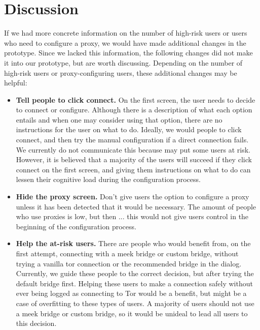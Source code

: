 \documentclass{template}
\begin{document}
\section{Discussion} 

If we had more concrete information on the number of high-risk users or users who need to configure a proxy, we would have made additional changes in the prototype. Since we lacked this information, the following changes did not make it into our prototype, but are worth discussing. Depending on the number of high-risk users or proxy-configuring users, these additional changes may be helpful: 
\begin{itemize} \itemsep1pt \parskip0pt  
\item {\bfseries Tell people to click connect.} On the first screen, the user needs to decide to connect or configure. Although there is a description of what each option entails and when one may consider using that option, there are no instructions for the user on what to do. Ideally, we would people to click connect, and then try the manual configuration if a direct connection fails. We currently do not communicate this because may put some users at risk. However, it is believed that a majority of the users will succeed if they click connect on the first screen, and giving them instructions on what to do can lessen their cognitive load during the configuration process. 
\item{\bfseries Hide the proxy screen.} Don't give users the option to configure a proxy unless it has been detected that it would be necessary. The amount of people who use proxies is low, but then ... this would not give users control in the beginning of the configuration process. 
\item{\bfseries Help the at-risk users.} There are people who would benefit from, on the first attempt, connecting with a meek bridge or custom bridge, without trying a vanilla tor connection or the recommended bridge in the dialog. Currently, we guide these people to the correct decision, but after trying the default bridge first. Helping these users to make a connection safely without ever being logged as connecting to Tor would be a benefit, but might be a case of overfitting to these types of users. A majority of users should not use a meek bridge or custom bridge, so it would be unideal to lead all users to this decision.
\end{itemize} 
\end{document}
